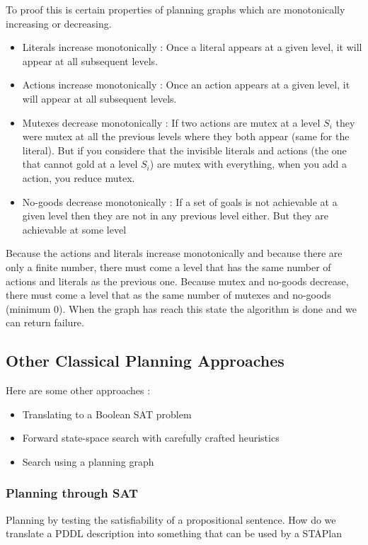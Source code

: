 To proof this is certain properties of planning graphs which are monotonically increasing or decreasing.
\begin{itemize}
    \item Literals increase monotonically : Once a literal appears at a given level, it will appear at all subsequent levels.
    \item Actions increase monotonically : Once an action appears at a given level, it will appear at all subsequent levels.
    \item Mutexes decrease monotonically : If two actions are mutex at a level $S_i$ they were mutex at all the previous levels where they both appear (same for the literal). But if you considere that the invisible literals and actions (the one that cannot gold at a level $S_i$) are mutex with everything, when you add a action, you reduce mutex.
    \item No-goods decrease monotonically : If a set of goals is not achievable at a given level then they are not in any previous level either. But they are achievable at some level 
\end{itemize}
Because the actions and literals increase monotonically and because there are only a finite number, 
there must come a level that has the same number of actions and literals as the previous one. Because mutex and no-goods decrease, there must come a level that as the same number of mutexes and no-goods (minimum 0). When the graph has reach this state the algorithm is done and we can return failure.

\subsection{Other Classical Planning Approaches}

Here are some other approaches :

\begin{itemize}
\item Translating to a Boolean SAT problem
\item Forward state-space search with carefully crafted heuristics
\item Search using a planning graph
\end{itemize}

\subsubsection{Planning through SAT}
Planning by testing the satisfiability of a propositional sentence. How do we translate a PDDL description into something that can be used by a STAPlan

